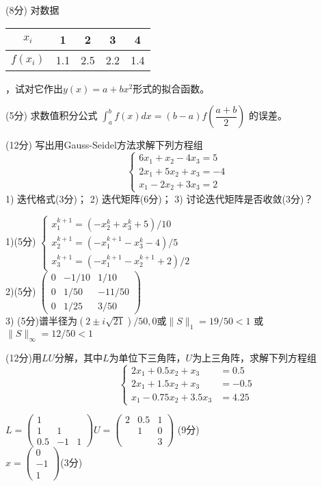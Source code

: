 \documentclass[12pt,letter]{ustcexam}
\begin{document}
\begin{problems}
\newpage
{}
\qu (8分) 对数据 
\begin{tabular}{c|cccc} $x_i$  & 1 & 2 & 3 & 4
\\\hline $f(x_i)$ & 1.1 & 2.5 & 2.2 & 1.4
\end{tabular} ，试对它作出$y(x)=a+b x^2$形式的拟合函数。

\vspace*{0.4\textheight}

\qu (5分) 求数值积分公式
$
 \displaystyle \int_a^b f(x) dx=(b-a)f\left(\dfrac{a+b}{2}\right)
$
的误差。


\newpage
\qu (12分)  写出用Gauss-Seidel方法求解下列方程组
$$\begin {cases} 6x_1+x_2-4x_3=5\\ 2 x_1+5x_2+ x_3=-4 \\ x_1-2x_2+3x_3=2
\end{cases}$$
1) 迭代格式(3分)；  2) 迭代矩阵(6分)； 3) 讨论迭代矩阵是否收敛(3分)？
\begin{sol}
1)(5分)
$
\left\{\begin{array}{l}
x_1^{k+1}=(-x_2^k+x_3^k+5)/10 \\
x_2^{k+1}=(-x_1^{k+1}-x_3^k-4)/5 \\
x_3^{k+1}=(-x_1^{k+1}-x_2^{k+1}+2)/2
\end{array}\right.
$ \\
2)(5分)
$
\left(\begin{array}{ccc}
0 & -1/10 & 1/10 \\
0 & 1/50 & -11/50 \\
0 & 1/25 & 3/50
\end{array}\right)
$ \\
3) (5分)谱半径为$(2\pm i\sqrt{21})/50,0$或$\|S\|_1=19/50<1$
   或$\|S\|_{\infty}=12/50<1$
\end{sol}

\newpage
\qu (12分)用$LU$分解，其中$L$为单位下三角阵，$U$为上三角阵，求解下列方程组
\[  \qquad \begin{cases}
2x_1+ 0.5x_2 + x_3&=0.5 \\
2x_1+ 1.5x_2 + x_3&=-0.5\\
x_1-0.75x_2 + 3.5x_3&=4.25
\end{cases}\]
\begin{sol}
$
L=
\left(\begin{array}{ccc}
1 &  &  \\
1 & 1 &  \\
0.5 & -1 & 1
\end{array}\right)
U=
\left(\begin{array}{ccc}
2 & 0.5  & 1 \\
 & 1 & 0  \\
 &  & 3
\end{array}\right)
$
(9分)\\
$
x=
\left(\begin{array}{l}
0 \\
-1 \\
1
\end{array}\right)
$(3分)
\end{sol}


\end{problems}
\end{document}
